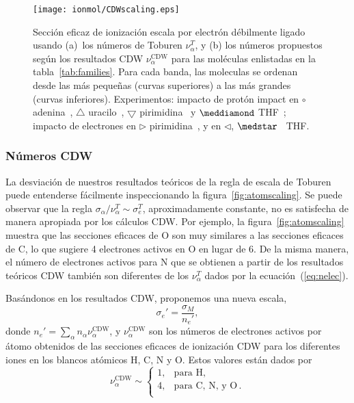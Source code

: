 \begin{figure}
\centering
\texttt{[image: ionmol/CDWscaling.eps]}
\caption[Sección eficaz de ionización por electrón débilmente ligado.]
{Sección eficaz de ionización escala por electrón débilmente ligado 
usando (a)~los números de Toburen $\nu_{\alpha}^T$, y (b) los
números propuestos según los resultados CDW $\nu_{\alpha}^{\text{CDW}}$ 
para las moléculas enlistadas en la tabla~\ref{tab:families}. 
Para cada banda, las moleculas se ordenan desde las más pequeñas (curvas
superiores) a las más grandes (curvas inferiores). Experimentos: 
impacto de protón impact en 
\mbox{\Large$\circ$} adenina~\cite{iriki2011}, 
$\triangle$ uracilo~\cite{itoh2013}, 
$\bigtriangledown$ pirimidina~\cite{wolff2014} y $\meddiamond$ 
THF~\cite{wang2016}; impacto de electrones en 
$\rhd$ pirimidina~\cite{bug2017}, y en $\lhd$, 
$\medstar$~\cite{wolf2019,fuss2009} THF.}
\label{fig:newscaling}
\end{figure}

\subsubsection{Números CDW}
\label{subsec:CDW}

La desviación de nuestros resultados teóricos de la regla de escala de 
Toburen puede entenderse fácilmente inspeccionando la
figura~\ref{fig:atomscaling}. Se puede observar que la regla 
$\sigma_{\alpha}/\nu_{\alpha}^T\sim \sigma_{e}^T$, aproximadamente 
constante, no es satisfecha de manera apropiada por los cálculos CDW. 
Por ejemplo, la figura~\ref{fig:atomscaling} muestra que las secciones
eficaces de O son muy similares a las secciones eficaces de C, lo que 
sugiere 4 electrones activos en O en lugar de 6. De la misma manera, el 
número de electrones activos para N que se obtienen a partir de los 
resultados teóricos CDW también son diferentes de los $\nu_{\alpha}^T$ 
dados por la ecuación~(\ref{eq:nelec}).

Basándonos en los resultados CDW, proponemos una nueva escala,
\begin{equation}
\sigma_{e}'=\frac{\sigma_M}{n_e'},
\label{32} 
\end{equation}
donde $n_e'=\sum_{\alpha}n_{\alpha}\nu_{\alpha}^{\text{CDW}}$, y
$\nu_{\alpha}^{\text{CDW}}$ son los números de electrones activos 
por átomo obtenidos de las secciones eficaces de ionización CDW para los 
diferentes iones en los blancos atómicos H, C, N y O. Estos valores están 
dados por
\begin{equation}
\nu_{\alpha }^{\text{CDW}} \sim\left\{ 
\begin{array}{ll}
1, & \text{para H,} \\
4, & \text{para C, N, y O}\,. \\ 
\end{array}
\right. 
\label{eq:scalingCDW}
\end{equation}

